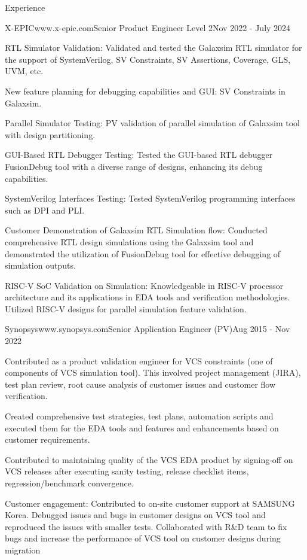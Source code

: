 \documentclass[
11pt, %
]{./assets/resume} %
\begin{document}
\begin{rSection}{Experience}
	\begin{rSubsectionX}{X-EPIC}{www.x-epic.com}{Senior Product Engineer Level 2}{Nov 2022 - July 2024}
		\item RTL Simulator Validation: Validated and tested the Galaxsim RTL simulator for the support of SystemVerilog, SV Constraints, SV Assertions, Coverage, GLS, UVM, etc.
		\item New feature planning for debugging capabilities and GUI: SV Constraints in Galaxsim.
		\item Parallel Simulator Testing: PV validation of parallel simulation of Galaxsim tool with design partitioning.
		\item GUI-Based RTL Debugger Testing: Tested the GUI-based RTL debugger FusionDebug tool with a diverse range of designs, enhancing its debug capabilities.
		\item SystemVerilog Interfaces Testing: Tested SystemVerilog programming interfaces such as DPI and PLI. 
		\item Customer Demonstration of Galaxsim RTL Simulation flow: Conducted comprehensive RTL design simulations using the Galaxsim tool and demonstrated the utilization of FusionDebug tool for effective debugging of simulation outputs.
		\item RISC-V SoC Validation on Simulation: Knowledgeable in RISC-V processor architecture and its applications in EDA tools and verification methodologies. Utilized RISC-V designs for parallel simulation feature validation.
	\end{rSubsectionX}
	\begin{rSubsectionX}{Synopsys}{www.synopsys.com}{Senior Application Engineer (PV)}{Aug 2015 - Nov 2022}
		\item Contributed as a product validation engineer for VCS constraints (one of components of VCS simulation tool). This involved project management (JIRA), test plan review, root cause analysis of customer issues and customer flow verification.
		\item Created comprehensive test strategies, test plans, automation scripts and executed them for the EDA tools and features and enhancements based on customer requirements.
		\item Contributed to maintaining quality of the VCS EDA product by signing-off on VCS releases after executing sanity testing, release checklist items, regression/benchmark convergence.
		\item Customer engagement: Contributed to on-site customer support at SAMSUNG Korea. Debugged issues and bugs in customer designs on VCS tool and reproduced the issues with smaller tests. Collaborated with R\&D team to fix bugs and increase the performance of VCS tool on customer designs during migration

\end{rSubsectionX}
\end{rSection}
\end{document}
